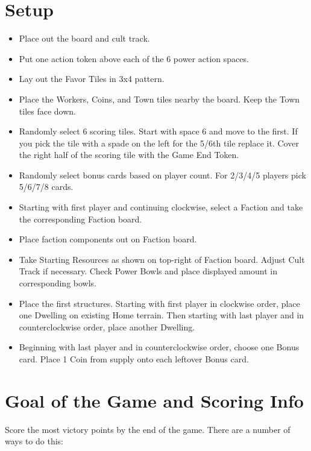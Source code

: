 \documentclass[12pt]{article}
\newenvironment{itemizeCustom}
{\begin{itemize}
  \setlength{\itemsep}{1pt}
  \setlength{\parskip}{0pt}
  \setlength{\parsep}{0pt}}
{\end{itemize}}
\begin{document}
\begin{multicols*}{2}

\section*{Setup}
\begin{itemizeCustom}
    \item Place out the board and cult track.
    \item Put one action token above each of the 6 power action spaces.
    \item Lay out the Favor Tiles in 3x4 pattern.
    \item Place the Workers, Coins, and Town tiles nearby the board. Keep the Town tiles face down.
    \item Randomly select 6 scoring tiles. Start with space 6 and move to the first. If you pick the tile with a spade on the left for the 5/6th tile replace it. Cover the right half of the scoring tile with the Game End Token.
    \item Randomly select bonus cards based on player count. For 2/3/4/5 players pick 5/6/7/8 cards.
    \item Starting with first player and continuing clockwise, select a Faction and take the corresponding Faction board.
    \item Place faction components out on Faction board.
    \item Take Starting Resources as shown on top-right of Faction board. Adjust Cult Track if necessary. Check Power Bowls and place displayed amount in corresponding bowls.
    \item Place the first structures. Starting with first player in clockwise order, place one Dwelling on existing Home terrain. Then starting with last player and in counterclockwise order, place another Dwelling.
    \item Beginning with last player and in counterclockwise order, choose one Bonus card. Place 1 Coin from supply onto each leftover Bonus card.
\end{itemizeCustom}

\section*{Goal of the Game and Scoring Info}
Score the most victory points by the end of the game. There are a number of ways to do this:


\end{multicols*}
\end{document}
